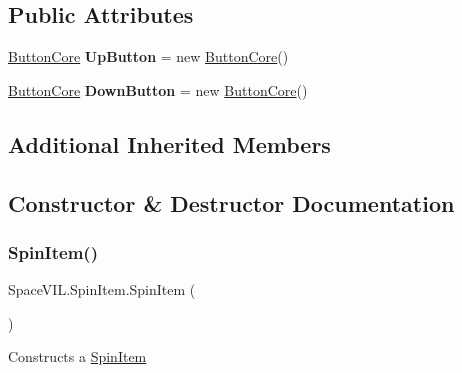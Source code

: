 \subsection*{Public Attributes}
\begin{DoxyCompactItemize}
\item 
\mbox{\label{class_space_v_i_l_1_1_spin_item_a7e1fb803e2c0ce9980fb8d4ace88326e}} 
\mbox{\hyperlink{class_space_v_i_l_1_1_button_core}{Button\+Core}} {\bfseries Up\+Button} = new \mbox{\hyperlink{class_space_v_i_l_1_1_button_core}{Button\+Core}}()
\item 
\mbox{\label{class_space_v_i_l_1_1_spin_item_a2bbc136b9f697401c735049514045bbc}} 
\mbox{\hyperlink{class_space_v_i_l_1_1_button_core}{Button\+Core}} {\bfseries Down\+Button} = new \mbox{\hyperlink{class_space_v_i_l_1_1_button_core}{Button\+Core}}()
\end{DoxyCompactItemize}
\subsection*{Additional Inherited Members}


\subsection{Constructor \& Destructor Documentation}
\mbox{\label{class_space_v_i_l_1_1_spin_item_aad1c32a29142563435b0b222d320fc99}} 
\subsubsection{\texorpdfstring{Spin\+Item()}{SpinItem()}}
{\footnotesize\ttfamily Space\+V\+I\+L.\+Spin\+Item.\+Spin\+Item (\begin{DoxyParamCaption}{ }\end{DoxyParamCaption})\hspace{0.3cm}{\ttfamily [inline]}}



Constructs a \mbox{\hyperlink{class_space_v_i_l_1_1_spin_item}{Spin\+Item}} 



